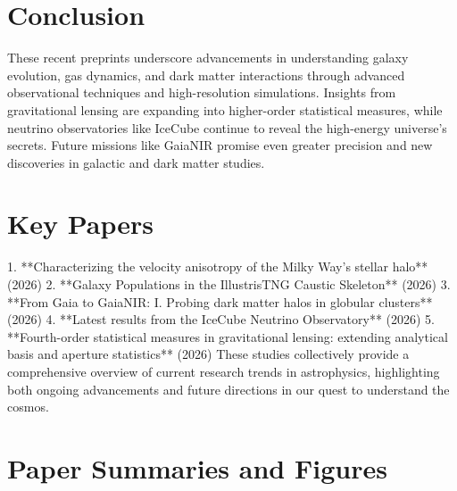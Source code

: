 \documentclass[11pt]{article}
\begin{document}
\section*{Conclusion}
These recent preprints underscore advancements in understanding galaxy evolution, gas dynamics, and dark matter interactions through advanced observational techniques and high-resolution simulations. Insights from gravitational lensing are expanding into higher-order statistical measures, while neutrino observatories like IceCube continue to reveal the high-energy universe's secrets. Future missions like GaiaNIR promise even greater precision and new discoveries in galactic and dark matter studies.
\section*{Key Papers}
1. **Characterizing the velocity anisotropy of the Milky Way’s stellar halo** (2026)
2. **Galaxy Populations in the IllustrisTNG Caustic Skeleton** (2026)
3. **From Gaia to GaiaNIR: I. Probing dark matter halos in globular clusters** (2026)
4. **Latest results from the IceCube Neutrino Observatory** (2026)
5. **Fourth-order statistical measures in gravitational lensing: extending analytical basis and aperture statistics** (2026)
These studies collectively provide a comprehensive overview of current research trends in astrophysics, highlighting both ongoing advancements and future directions in our quest to understand the cosmos.
\newpage
\section*{Paper Summaries and Figures}
\end{document}
